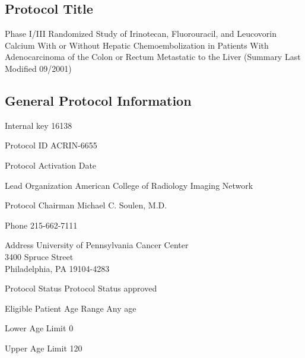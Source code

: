 \documentclass[12pt]{article}
\newcounter{qC}
\renewcommand\headrulewidth{1pt}
\renewcommand\footrulewidth{1pt}
\newcommand{\entrylabel}[1]{\mbox{\bfseries{#1:}}\hfil}
\newenvironment{entry}
   {\begin{list}{}%
       {\renewcommand{\makelabel}{\entrylabel}%
        \setlength{\labelwidth}{170pt}%
       \setlength{\itemsep}{-5pt}%
        \setlength{\leftmargin}{\labelwidth+\labelsep}%
       }%
   }%
{\end{list}}
\newcommand{\TheProtocolID}{ACRIN-6655}
\begin{document}
\fancypagestyle{plain}{%
    \fancyhead[L]{\today}
    \fancyfoot[C]{\thepage}
    \renewcommand\headrulewidth{1pt}
    \renewcommand\footrulewidth{1pt}}

     \makeatletter \renewcommand{} \makeatother
 
\setcounter{qC}{0}
\subsection*{Protocol Title}
Phase I/III Randomized Study of Irinotecan, Fluorouracil, and Leucovorin
Calcium With or Without Hepatic Chemoembolization in Patients With
Adenocarcinoma of the Colon or Rectum Metastatic to the Liver (Summary
Last Modified 09/2001)

\subsection*{General Protocol Information}
\par
\setcounter{qC}{0}
\begin{entry}
\item[Internal key]               16138 
\item[Protocol ID]                \TheProtocolID
\item[Protocol Activation Date]           
\item[Lead Organization]          American College of Radiology Imaging Network

\item[Protocol Chairman]          Michael C. Soulen, M.D.
\item[Phone]  215-662-7111
\item[Address] University of Pennsylvania Cancer Center \\
                                  3400 Spruce Street \\
                                  Philadelphia, PA  19104-4283
\item[Protocol Status]            Protocol Status approved

\item[Eligible Patient Age Range] Any age
\item[Lower Age Limit]            0
\item[Upper Age Limit]            120
\end{entry}
\end{document}
